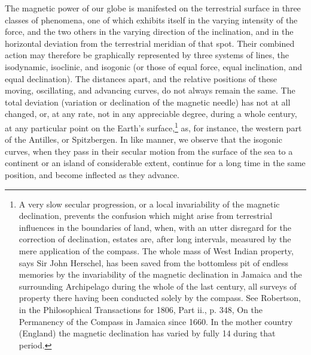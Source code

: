 The magnetic power of our globe is manifested on the terrestrial surface in three classes of phenomena, one of which exhibits itself in the varying intensity of the force, and the two others in the varying direction of the inclination, and in the horizontal deviation from the terrestrial meridian of that spot. Their combined action may therefore be graphically represented by three systems of lines, the isodynamic, isoclinic, and isogonic (or those of equal force, equal inclination, and equal declination). The distances apart, and the relative positions of these moving, oscillating, and advancing curves, do not always remain the same. The total deviation (variation or declination of the magnetic needle) has not at all changed, or, at any rate, not in any appreciable degree, during a whole century, at any particular point on the Earth's surface,\footnote{A very slow secular progression, or a local invariability of the magnetic declination, prevents the confusion which might arise from terrestrial influences in the boundaries of land, when, with an utter disregard for the correction of declination, estates are, after long intervals, measured by the mere application of the compass. The whole mass of West Indian property, says Sir John Herschel, has been saved from the bottomless pit of endless memories by the invariability of the magnetic declination in Jamaica and the surrounding Archipelago during the whole of the last century, all surveys of property there having been conducted solely by the compass. See Robertson, in the Philosophical Transactions for 1806, Part ii., p. 348, On the Permanency of the Compass in Jamaica since 1660. In the mother country (England) the magnetic declination has varied by fully 14 during that period.} as, for instance, the western part of the Antilles, or Spitzbergen. In like manner, we observe that the isogonic curves, when they pass in their secular motion from the surface of the sea to a continent or an island of considerable extent, continue for a long time in the same position, and become inflected as they advance.


